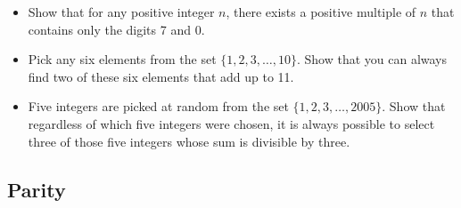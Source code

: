 \documentclass[12pt]{article}
\begin{document}
\begin{itemize}
  \item Show that for any positive integer $n$, there exists a positive multiple of $n$ that contains only the digits 7 and 0.

  \item Pick any six elements from the set $\{1, 2, 3, \ldots, 10\}$. Show that you can always find two of these six elements that add up to 11.

  \item  Five integers are picked at random from the set $\{1, 2, 3, \ldots, 2005\}$. Show that regardless of which five integers were chosen, it is always possible to select three of those five integers whose sum is divisible by three.
\end{itemize}

\subsection{Parity}
\end{document}
